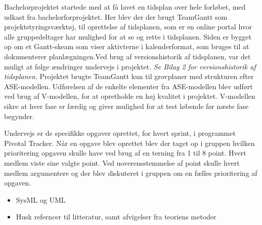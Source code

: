 Bachelorprojektet startede med at få lavet en tidsplan over hele forløbet, med udkast fra bachelorforprojektet. Her blev der der brugt TeamGantt som projektstyringsværktøj, til oprettelse af tidsplanen, som er en online portal hvor alle gruppedeltager har mulighed for at se og rette i tidsplanen. Siden er bygget op om et Gantt-skeam som viser aktivterne i kalenderformat, som bruges til at dokumenterer planlægningen\cite[s. 297]{IntroductionCompendium}.Ved brug af versionshistorik af tidsplanen, var det muligt at følge ændringer undervejs i projektet. \textit{Se Bilag 2 for versionshistorik af tidsplanen}. Projektet brugte TeamGantt kun til grovplaner med strukturen efter ASE-modellen. Udførelsen af de enkelte elementer fra ASE-modellen blev udført ved brug af V-modellen, for at opretholde en høj kvalitet i projektet. V-modellen sikre at hver fase er færdig og giver mulighed for at test løbende før næste fase begynder\cite[s. 12]{IngenirhjskolenAarhusUniversitetDevelopmentASE}. 




Undervejs er de specifikke opgaver oprettet, for hvert sprint, i programmet Pivotal Tracker. Når en opgave blev oprettet blev der taget op i gruppen hvilken prioritering opgaven skulle have ved brug af en terning fra 1 til 8 point. Hvert medlem viste sine valgte point. Ved uoverensstemmelse af point skulle hvert medlem argumentere og der blev diskuteret i gruppen om en fælles prioritering af opgaven.  






\begin{itemize}
\item SysML og UML
\item Husk referncer til litteratur, samt afvigelser fra teoriens metoder
\end{itemize}

